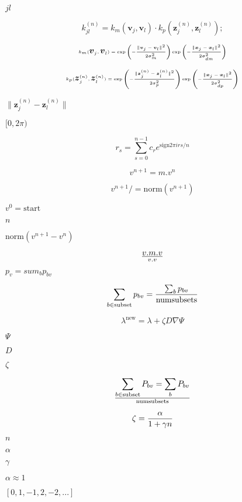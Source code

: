 \documentclass{article}
\begin{document}
$ jl $
\pagebreak

\[ k^{(n)}_{jl} = k_m(\boldsymbol{v}_j,\boldsymbol{v}_l) \cdot k_p(\boldsymbol{z}^{(n)}_j,\boldsymbol{z}^{(n)}_l); \]
\pagebreak

\[ k_m(\boldsymbol{v}_j,\boldsymbol{v}_l) = \exp \left(\tiny - \frac{\| \boldsymbol{v}_j-\boldsymbol{v}_l \|^2}{2 \sigma_m^2} \right) \exp \left(- \frac{\tiny \| \boldsymbol{x}_j-\boldsymbol{x}_l \|^2}{ \tiny 2 \sigma_{dm}^2} \right) \]
\pagebreak

\[ k_p(\boldsymbol{z}^{(n)}_j,\boldsymbol{z}^{(n)}_l) = \exp \left(\tiny - \frac{\| \boldsymbol{z}^{(n)}_j-\boldsymbol{z}^{(n)}_l \|^2}{2 \sigma_p^2} \right) \exp \left(\tiny - \frac{\| \boldsymbol{x}_j-\boldsymbol{x}_l \|^2}{ \tiny{2 \sigma_{dp}^2}} \right) \]
\pagebreak

$ \| \boldsymbol{z}^{(n)}_j-\boldsymbol{z}^{(n)}_l \| $
\pagebreak

$[0,2\pi)$
\pagebreak

\[ r_s = \sum_{s=0}^{n-1} c_r e^{\mathrm{sign} 2\pi i r s/n} \]
\pagebreak

\[v^{n+1}=m.v^{n}\]
\pagebreak

\[v^{n+1}/=\mathrm{norm}(v^{n+1})\]
\pagebreak

$ v^{0}=\mathrm{start} $
\pagebreak

$ n$
\pagebreak

$ \mathrm{norm}(v^{n+1}-v^{n})$
\pagebreak

\[v.m.v \over v.v \]
\pagebreak

$p_v = sum_b p_{bv}$
\pagebreak

\[\sum_{b \in \rm{subset}} p_{bv} = { \sum_b p_{bv} \over \rm{numsubsets} } \]
\pagebreak

\[ \lambda^\mathrm{new} = \lambda + \zeta D \nabla \Psi \]
\pagebreak

$\Psi$
\pagebreak

$D$
\pagebreak

$\zeta$
\pagebreak

\[\sum_{b \in \mathrm{subset}} P_{bv} = \sum_b P_{bv} \over \mathrm{numsubsets} \]
\pagebreak

\[ \zeta= { \alpha \over 1+ \gamma n } \]
\pagebreak

$n$
\pagebreak

$\alpha$
\pagebreak

$\gamma$
\pagebreak

$\alpha \approx 1$
\pagebreak

$ [0, 1, -1, 2, -2, ...] $
\pagebreak
\end{document}
